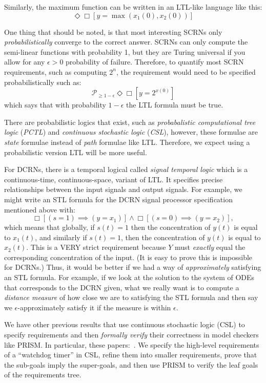 Similarly, the maximum function can be written in an LTL-like language like this:
\begin{equation}\label{eq:max_ltl}
    \Diamond\Box[y=\max(x_1(0),x_2(0))]
\end{equation}

One thing that should be noted, is that most interesting SCRNs only \emph{probabilistically} converge to the correct answer.
SCRNs can only compute the semi-linear functions with probability 1, but they are Turing universal if you allow for any \( \epsilon > 0 \) probability of failure.
Therefore, to quantify most SCRN requirements, such as computing \( 2^n \), the requirement would need to be specified probabilistically such as:
\begin{equation}
    \mathcal{P}_{\ge1-\epsilon}\Diamond\Box[y=2^{x(0)}]
\end{equation}
which says that with probability \( 1 - \epsilon \) the LTL formula must be true.

There are probabilistic logics that exist, such as \emph{probabalistic computational tree logic} (\emph{PCTL}) and \emph{continuous stochastic logic} (\emph{CSL}), however, these formulae are \emph{state} formulae instead of \emph{path} formulae like LTL.
Therefore, we expect using a probabilistic version LTL will be more useful.

For DCRNs, there is a temporal logical called \emph{signal temporal logic} which is a continuous-time, continuous-space, variant of LTL.
It specifies precise relationships between the input signals and output signals.
For example, we might write an STL formula for the DCRN signal processor specification mentioned above with:
\begin{equation}
    \Box[(s=1)\implies(y=x_1)]\land\Box[(s=0)\implies(y=x_2)],
\end{equation}
which means that globally, if \( s(t)=1 \) then the concentration of \( y(t) \) is equal to \( x_1(t) \), and similarly if \( s(t) = 1 \), then the concentration of \( y(t) \) is equal to \( x_2(t) \).
This is a VERY strict requirement because \( Y \) must \emph{exactly} equal the corresponding concentration of the input.
(It is easy to prove this is impossible for DCRNs.)
Thus, it would be better if we had a way of \emph{approximately} satisfying an STL formula.
For example, if we look at the solution to the system of ODEs that corresponds to the DCRN given, what we really want is to compute a \emph{distance measure} of how close we are to satisfying the STL formula and then say we \emph{\(\epsilon\)}-approximately satisfy it if the measure is within \emph{\(\epsilon\)}.

We have other previous results that use continuous stochastic logic (CSL) to specify requirements and then \emph{formally verify} their correctness in model checkers like PRISM.
In particular, these papers:~\cite{cEHKLLL14,tosem19}.
We specify the high-level requirements of a ``watchdog timer'' in CSL, refine them into smaller requirements, prove that the sub-goals imply the super-goals, and then use PRISM to verify the leaf goals of the requirements tree.
